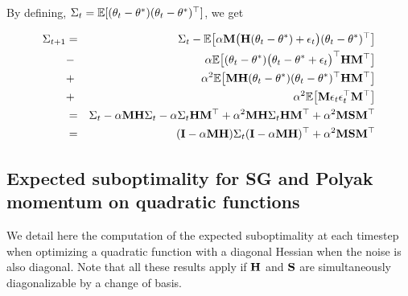 By defining, ${\mathrm{\Sigma}}_t = \mathbb{E} [ (\theta_t - \theta^\ast)  (\theta_t - \theta^\ast)^\top ]$, we get

\begin{eqnarray}
{\mathrm{\Sigma}}_{t+1} &=& {\mathrm{\Sigma}}_t - \mathbb{E} \big[ \alpha {\mathbf{M}} \big({\mathbf{H}} (\theta_t - \theta^\ast) + \epsilon_t\big)  (\theta_t - \theta^\ast)^\top\big] \\ 
&-& \alpha \mathbb{E} \big[  (\theta_t - \theta^\ast) \big(\theta_t - \theta^\ast +\epsilon_t\big)^\top {\mathbf{H}} {\mathbf{M}}^\top\big]  \\
&+& \alpha^2\mathbb{E} \big[  {\mathbf{M}} {\mathbf{H}} (\theta_t - \theta^\ast) (\theta_t - \theta^\ast)^\top {\mathbf{H}} {\mathbf{M}}^\top \big] \\
&+& \alpha^2\mathbb{E} \big[  {\mathbf{M}}  \epsilon_t \epsilon_t^\top  {\mathbf{M}}^\top \big] \\
&=& {\mathrm{\Sigma}}_t - \alpha {\mathbf{M}} {\mathbf{H}} {\mathrm{\Sigma}}_t - \alpha {\mathrm{\Sigma}}_t {\mathbf{H}} {\mathbf{M}}^\top + \alpha^2 {\mathbf{M}} {\mathbf{H}} {\mathrm{\Sigma}}_t {\mathbf{H}} {\mathbf{M}}^\top + \alpha^2 {\mathbf{M}} {\mathbf{S}} {\mathbf{M}}^\top\\
&=& ({\mathbf{I}} - \alpha {\mathbf{M}} {\mathbf{H}}) {\mathrm{\Sigma}}_t ({\mathbf{I}} - \alpha {\mathbf{M}} {\mathbf{H}})^\top +  \alpha^2 {\mathbf{M}} {\mathbf{S}} {\mathbf{M}}^\top\\
\end{eqnarray}


\subsection{Expected suboptimality for SG and Polyak momentum on quadratic functions}
\label{sec:variance_computation}
We detail here the computation of the expected suboptimality at each timestep when optimizing a quadratic function with a diagonal Hessian when the noise is also diagonal. Note that all these results apply if ${\mathbf{H}}$ and ${\mathbf{S}}$ are simultaneously diagonalizable by a change of basis.

